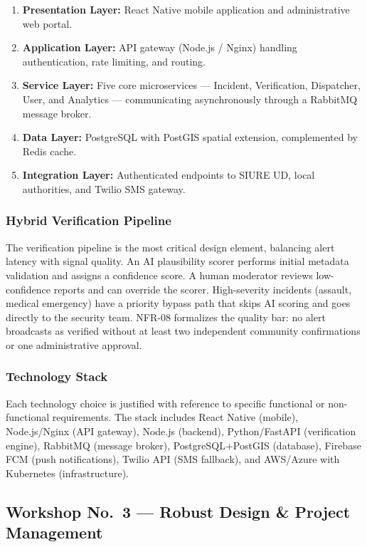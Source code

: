 \documentclass[11pt,a4paper]{article}
\begin{document}
\begin{enumerate}
\item \textbf{Presentation Layer:} React Native mobile application and administrative web portal.
\item \textbf{Application Layer:} API gateway (Node.js / Nginx) handling authentication, rate limiting, and routing.
\item \textbf{Service Layer:} Five core microservices --- Incident, Verification, Dispatcher, User, and Analytics --- communicating asynchronously through a RabbitMQ message broker.
\item \textbf{Data Layer:} PostgreSQL with PostGIS spatial extension, complemented by Redis cache.
\item \textbf{Integration Layer:} Authenticated endpoints to SIURE UD, local authorities, and Twilio SMS gateway.
\end{enumerate}

\subsubsection{Hybrid Verification Pipeline}

The verification pipeline is the most critical design element, balancing alert latency with signal quality. An AI plausibility scorer performs initial metadata validation and assigns a confidence score. A human moderator reviews low-confidence reports and can override the scorer. High-severity incidents (assault, medical emergency) have a priority bypass path that skips AI scoring and goes directly to the security team. NFR-08 formalizes the quality bar: no alert broadcasts as verified without at least two independent community confirmations or one administrative approval.

\subsubsection{Technology Stack}

Each technology choice is justified with reference to specific functional or non-functional requirements. The stack includes React Native (mobile), Node.js/Nginx (API gateway), Node.js (backend), Python/FastAPI (verification engine), RabbitMQ (message broker), PostgreSQL+PostGIS (database), Firebase FCM (push notifications), Twilio API (SMS fallback), and AWS/Azure with Kubernetes (infrastructure).

\subsection{Workshop No.\ 3 --- Robust Design \& Project Management}
\end{document}
